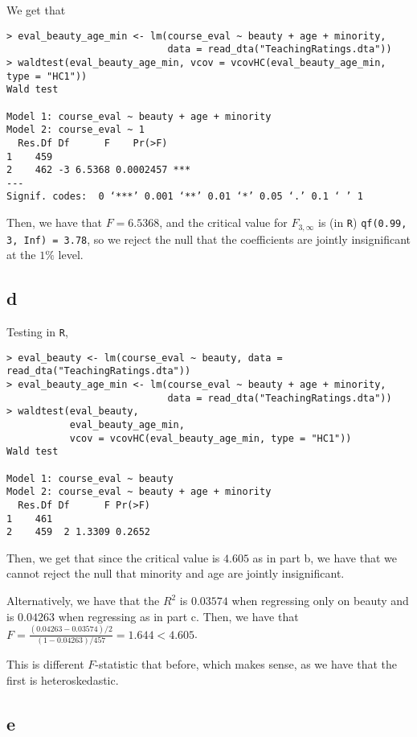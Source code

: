 \documentclass[12pt,letterpaper]{article}
\theoremstyle{definition}
\begin{document}
We get that
\begin{Verbatim}[fontsize=\small]
> eval_beauty_age_min <- lm(course_eval ~ beauty + age + minority,
                            data = read_dta("TeachingRatings.dta"))
> waldtest(eval_beauty_age_min, vcov = vcovHC(eval_beauty_age_min, type = "HC1"))
Wald test

Model 1: course_eval ~ beauty + age + minority
Model 2: course_eval ~ 1
  Res.Df Df      F    Pr(>F)
1    459
2    462 -3 6.5368 0.0002457 ***
---
Signif. codes:  0 ‘***’ 0.001 ‘**’ 0.01 ‘*’ 0.05 ‘.’ 0.1 ‘ ’ 1
\end{Verbatim}
Then, we have that $F = 6.5368$, and the critical value for $F_{3,\infty}$ is (in \verb|R|) \verb|qf(0.99, 3, Inf) = 3.78|, so we reject the null that the coefficients are jointly insignificant at the $1\%$ level.

\subsection*{d}

Testing in \verb|R|,
\begin{Verbatim}[fontsize=\small]
> eval_beauty <- lm(course_eval ~ beauty, data = read_dta("TeachingRatings.dta"))
> eval_beauty_age_min <- lm(course_eval ~ beauty + age + minority,
                            data = read_dta("TeachingRatings.dta"))
> waldtest(eval_beauty,
           eval_beauty_age_min,
           vcov = vcovHC(eval_beauty_age_min, type = "HC1"))
Wald test

Model 1: course_eval ~ beauty
Model 2: course_eval ~ beauty + age + minority
  Res.Df Df      F Pr(>F)
1    461
2    459  2 1.3309 0.2652
\end{Verbatim}
Then, we get that since the critical value is $4.605$ as in part b, we have that we cannot reject the null that minority and age are jointly insignificant.

Alternatively, we have that the $R^{2}$ is $0.03574$ when regressing only on beauty and is $0.04263$ when regressing as in part c. Then, we have that $F = \frac{(0.04263 - 0.03574) / 2}{(1 - 0.04263) / 457} = 1.644 < 4.605$.

This is different $F$-statistic that before, which makes sense, as we have that the first is heteroskedastic.

\subsection*{e}
\end{document}
